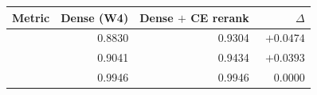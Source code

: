 \begin{tabular}{lrrr}
    \toprule
    Metric & Dense (W4) & Dense $+$ CE rerank & $\Delta$ \\
    \midrule
    \mrr{} & 0.8830 & 0.9304 & $\mathbf{+0.0474}$ \\
    \ndcg{} & 0.9041 & 0.9434 & $+0.0393$ \\
    \recallH{} & 0.9946 & 0.9946 & $\phantom{+}0.0000$ \\
    \bottomrule
\end{tabular}
